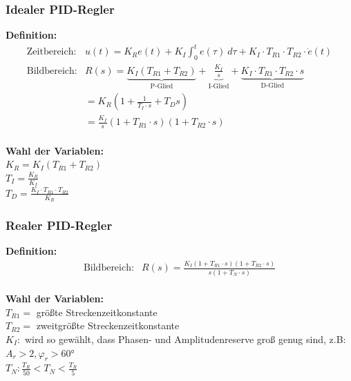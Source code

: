 \documentclass[10pt,a4paper]{article}
\begin{document}
\subsubsection{Idealer PID-Regler}
\textbf{Definition:}
$$
	\begin{array}{ll}
	\text{Zeitbereich:} & u(t) = K_R e(t) + K_I \int_0^t e(\tau) ~d\tau + K_I ⋅ T_{R1} ⋅ T_{R2} ⋅ \dot e(t)\\
	\text{Bildbereich:} & R(s) = \underbrace{K_I(T_{R1} + T_{R2})}_{\text{P-Glied}} + \underbrace{\frac{K_I}{s}}_{\text{I-Glied}} + \underbrace{K_I ⋅ T_{R1} ⋅ T_{R2} ⋅ s}_{\text{D-Glied}} \\
	& = K_R(1 + \frac{1}{T_I ⋅ s} + T_D s) \\
	& = \frac{K_I}{s}(1 + T_{R1} ⋅ s)(1 + T_{R2} ⋅ s)
	\end{array}
$$ \\


\textbf{Wahl der Variablen:} \\
$K_R = K_I(T_{R1} + T_{R2})$  \\
$T_I = \frac{K_R}{K_I}$ \\
$T_D = \frac{K_I ⋅ T_{R1} ⋅ T_{R2}}{K_R}$ \\


\subsubsection{Realer PID-Regler}
\textbf{Definition:}
$$
	\begin{array}{ll}
	\text{Bildbereich:} & R(s) = \frac{K_I(1 + T_{R1} ⋅ s)(1 + T_{R2} ⋅ s)}{s(1 + T_N ⋅ s)}
	\end{array}
$$ \\

\textbf{Wahl der Variablen:} \\
$T_{R1} =$ größte Streckenzeitkonstante  \\
$T_{R2} =$ zweitgrößte Streckenzeitkonstante \\
$K_I:$ wird so gewählt, dass Phasen- und Amplitudenreserve groß genug sind, z.B: $A_r > 2, \varphi_r > 60°$ \\
$T_N: \frac{T_R}{50} < T_N < \frac{T_R}{5}$ \\
\end{document}
